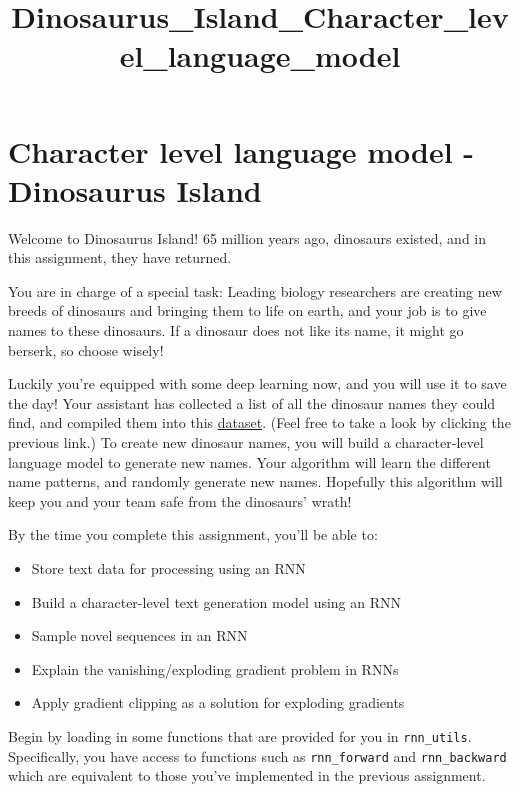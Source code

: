 \documentclass[11pt]{article}
\title{Dinosaurus\_Island\_Character\_level\_language\_model}
\providecommand{\tightlist}{%
      \setlength{\itemsep}{0pt}\setlength{\parskip}{0pt}}
\begin{document}
    
    \maketitle
    
    

    
    \hypertarget{character-level-language-model---dinosaurus-island}{%
\section{Character level language model - Dinosaurus
Island}\label{character-level-language-model---dinosaurus-island}}

Welcome to Dinosaurus Island! 65 million years ago, dinosaurs existed,
and in this assignment, they have returned.

You are in charge of a special task: Leading biology researchers are
creating new breeds of dinosaurs and bringing them to life on earth, and
your job is to give names to these dinosaurs. If a dinosaur does not
like its name, it might go berserk, so choose wisely!

Luckily you're equipped with some deep learning now, and you will use it
to save the day! Your assistant has collected a list of all the dinosaur
names they could find, and compiled them into this
\href{dinos.txt}{dataset}. (Feel free to take a look by clicking the
previous link.) To create new dinosaur names, you will build a
character-level language model to generate new names. Your algorithm
will learn the different name patterns, and randomly generate new names.
Hopefully this algorithm will keep you and your team safe from the
dinosaurs' wrath!

By the time you complete this assignment, you'll be able to:

\begin{itemize}
\tightlist
\item
  Store text data for processing using an RNN
\item
  Build a character-level text generation model using an RNN
\item
  Sample novel sequences in an RNN
\item
  Explain the vanishing/exploding gradient problem in RNNs
\item
  Apply gradient clipping as a solution for exploding gradients
\end{itemize}

Begin by loading in some functions that are provided for you in
\texttt{rnn\_utils}. Specifically, you have access to functions such as
\texttt{rnn\_forward} and \texttt{rnn\_backward} which are equivalent to
those you've implemented in the previous assignment.
\end{document}
